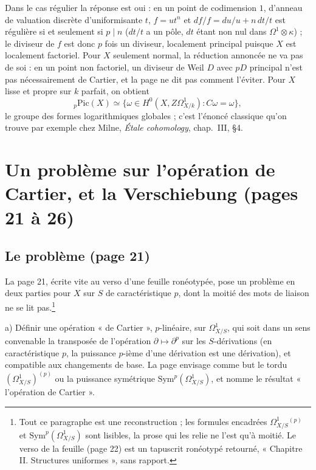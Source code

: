 \documentclass[11pt,a4paper]{article}
\begin{document}
Dans le cas régulier la réponse est oui : en un point de codimension $1$,
d'anneau de valuation discrète d'uniformisante $t$, $f = ut^{n}$ et $df/f =
du/u + n\,dt/t$ est régulière si et seulement si $p \mid n$ ($dt/t$ a un pôle,
$dt$ étant non nul dans $\Omega^1 \otimes \kappa$) ; le diviseur de $f$ est
donc $p$ fois un diviseur, localement principal puisque $X$ est localement
factoriel. Pour $X$ seulement normal, la réduction annoncée ne va pas de soi :
en un point non factoriel, un diviseur de Weil $D$ avec $pD$ principal n'est
pas nécessairement de Cartier, et la page ne dit pas comment l'éviter. Pour
$X$ lisse et propre sur $k$ parfait, on obtient
\[
{}_p\mathrm{Pic}(X) \simeq \lbrace \omega \in H^0(X, Z\Omega^1_{X/k}) :
C\omega = \omega \rbrace,
\]
le groupe des formes logarithmiques globales ; c'est l'énoncé classique
qu'on trouve par exemple chez Milne, \emph{Étale cohomology}, chap.~III, §4.

\section*{Un problème sur l'opération de Cartier, et la Verschiebung (pages 21 à 26)}

\subsection*{Le problème (page 21)}

La page 21, écrite vite au verso d'une feuille ronéotypée, pose un problème en
deux parties pour $X$ sur $S$ de caractéristique $p$, dont la moitié des mots
de liaison ne se lit pas.\footnote{Tout ce paragraphe est une reconstruction ;
les formules encadrées $\Omega^1_{X/S}{}^{(p)}$ et
$\mathrm{Sym}^{p}(\Omega^1_{X/S})$ sont lisibles, la prose qui les relie ne
l'est qu'à moitié. Le verso de la feuille (page 22) est un tapuscrit ronéotypé
retourné, « Chapitre II. Structures uniformes », sans rapport.}

a) Définir une opération « de Cartier », $p$-linéaire, sur
$\Omega^1_{X/S}$, qui soit dans un sens convenable la transposée de
l'opération $\partial \mapsto \partial^{p}$ sur les $S$-dérivations (en
caractéristique $p$, la puissance $p$-ième d'une dérivation est une
dérivation), et compatible aux changements de base. La page envisage comme
but le tordu $(\Omega^1_{X/S})^{(p)}$ ou la puissance symétrique
$\mathrm{Sym}^{p}(\Omega^1_{X/S})$, et nomme le résultat « l'opération de
Cartier ».
\end{document}
